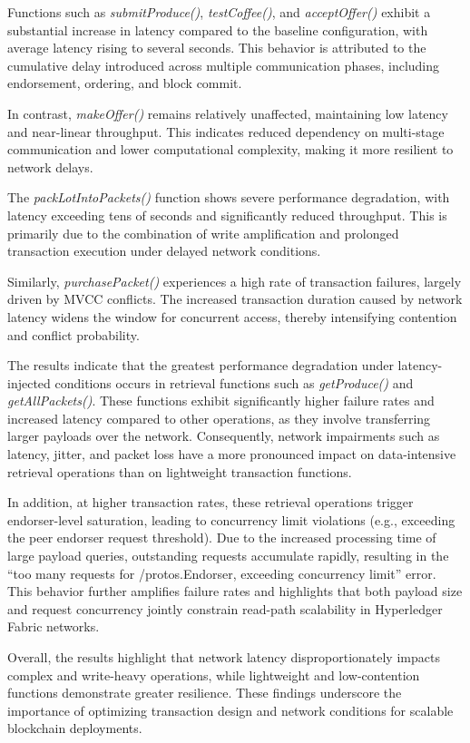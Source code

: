 \documentclass[12pt]{article}
\begin{document}
	Functions such as \textit{submitProduce()}, \textit{testCoffee()}, and \textit{acceptOffer()} exhibit a substantial increase in latency compared to the baseline configuration, with average latency rising to several seconds. This behavior is attributed to the cumulative delay introduced across multiple communication phases, including endorsement, ordering, and block commit.
	
	In contrast, \textit{makeOffer()} remains relatively unaffected, maintaining low latency and near-linear throughput. This indicates reduced dependency on multi-stage communication and lower computational complexity, making it more resilient to network delays.
	
	The \textit{packLotIntoPackets()} function shows severe performance degradation, with latency exceeding tens of seconds and significantly reduced throughput. This is primarily due to the combination of write amplification and prolonged transaction execution under delayed network conditions.
	
	Similarly, \textit{purchasePacket()} experiences a high rate of transaction failures, largely driven by MVCC conflicts. The increased transaction duration caused by network latency widens the window for concurrent access, thereby intensifying contention and conflict probability.
	
	The results indicate that the greatest performance degradation under latency-injected conditions occurs in retrieval functions such as \textit{getProduce()} and \textit{getAllPackets()}. These functions exhibit significantly higher failure rates and increased latency compared to other operations, as they involve transferring larger payloads over the network. Consequently, network impairments such as latency, jitter, and packet loss have a more pronounced impact on data-intensive retrieval operations than on lightweight transaction functions.
	
	In addition, at higher transaction rates, these retrieval operations trigger endorser-level saturation, leading to concurrency limit violations (e.g., exceeding the peer endorser request threshold). Due to the increased processing time of large payload queries, outstanding requests accumulate rapidly, resulting in the “too many requests for /protos.Endorser, exceeding concurrency limit” error. This behavior further amplifies failure rates and highlights that both payload size and request concurrency jointly constrain read-path scalability in Hyperledger Fabric networks.
	
	Overall, the results highlight that network latency disproportionately impacts complex and write-heavy operations, while lightweight and low-contention functions demonstrate greater resilience. These findings underscore the importance of optimizing transaction design and network conditions for scalable blockchain deployments.
	
\end{document}
